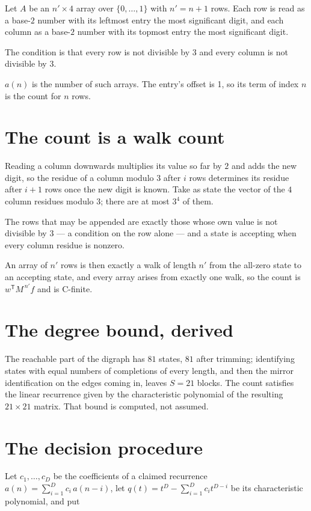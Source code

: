 \documentclass[11pt]{article}
\theoremstyle{definition}
\begin{document}
Let $A$ be an $n' \times 4$ array over $\{0,\dots,1\}$ with $n' = n + 1$ rows. Each row is read as a base-$2$ number with its leftmost entry the most significant digit, and each column as a base-$2$ number with its topmost entry the most significant digit.

The condition is that every row is not divisible by $3$ and every column is not divisible by $3$.

$a(n)$ is the number of such arrays. The entry's offset is 1, so its term of index $n$ is the count for $n$ rows.

\section{The count is a walk count}

Reading a column downwards multiplies its value so far by $2$ and adds the new digit, so the residue of a column modulo $3$ after $i$ rows determines its residue after $i+1$ rows once the new digit is known. Take as state the vector of the $4$ column residues modulo $3$; there are at most $3^{4}$ of them.

The rows that may be appended are exactly those whose own value is not divisible by $3$ --- a condition on the row alone --- and a state is accepting when every column residue is nonzero.

An array of $n'$ rows is then exactly a walk of length $n'$ from the all-zero state to an accepting state, and every array arises from exactly one walk, so the count is $w^{\mathsf T}M^{\,n'}f$ and is C-finite.

\section{The degree bound, derived}

The reachable part of the digraph has $81$ states, $81$ after trimming; identifying states with equal numbers of completions of every length, and then the mirror identification on the edges coming in, leaves $S = 21$ blocks. The count satisfies the linear recurrence given by the characteristic polynomial of the resulting $21\times21$ matrix. That bound is computed, not assumed.

\section{The decision procedure}

Let $c_1,\dots,c_D$ be the coefficients of a claimed recurrence $a(n) = \sum_{i=1}^{D} c_i\,a(n-i)$, let $q(t) = t^{D} - \sum_{i=1}^{D} c_i t^{D-i}$ be its characteristic polynomial, and put
\end{document}
